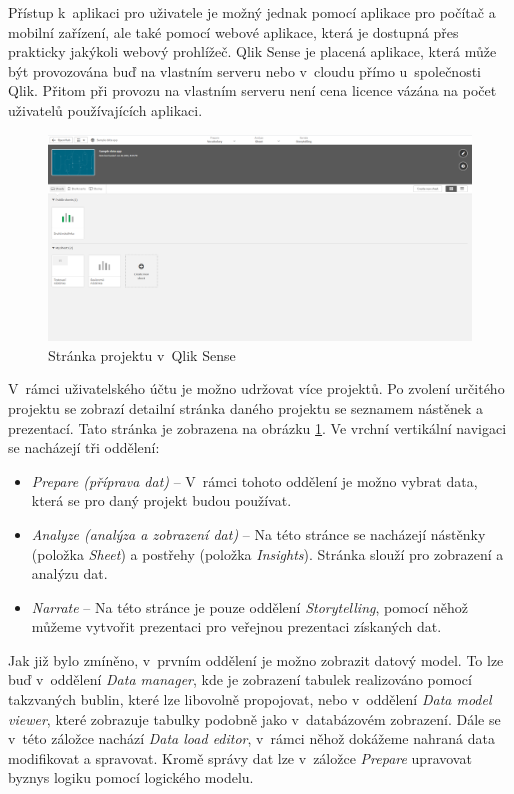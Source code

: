 \documentclass[czech,master]{diploma}
\begin{document}
Přístup k~aplikaci pro uživatele je možný jednak pomocí aplikace pro počítač a mobilní zařízení, ale také pomocí webové aplikace, která je dostupná přes prakticky jakýkoli webový prohlížeč. Qlik Sense je placená aplikace, která může být provozována buď na vlastním serveru nebo v~cloudu přímo u~společnosti Qlik. Přitom při provozu na vlastním serveru není cena licence vázána na počet uživatelů používajících aplikaci.

\begin{figure}[!ht]
    \centering
    \includegraphics[width=1\textwidth]{Diplomka/Figures/qlik_project.png}
    \caption{Stránka projektu v~Qlik Sense}
    \label{fig:qlik_project}
\end{figure}


V~rámci uživatelského účtu je možno udržovat více projektů. Po zvolení určitého projektu se zobrazí detailní stránka daného projektu se seznamem nástěnek a prezentací. Tato stránka je zobrazena na obrázku \ref{fig:qlik_project}.  Ve vrchní vertikální navigaci se nacházejí tři oddělení:

\begin{itemize}
\item \textit{Prepare (příprava dat)} -- V~rámci tohoto oddělení je možno vybrat data, která se pro daný projekt budou používat.
\item \textit{Analyze (analýza a zobrazení dat)} -- Na této stránce se nacházejí nástěnky (položka \textit{Sheet}) a postřehy (položka \textit{Insights}). Stránka slouží pro zobrazení a analýzu dat.
\item \textit{Narrate} -- Na této stránce je pouze oddělení \textit{Storytelling}, pomocí něhož můžeme vytvořit prezentaci pro veřejnou prezentaci získaných dat.
\end{itemize}


Jak již bylo zmíněno, v~prvním oddělení je možno zobrazit datový model. To lze buď v~oddělení \textit{Data manager}, kde je zobrazení tabulek realizováno pomocí takzvaných bublin, které lze libovolně propojovat, nebo v~oddělení \textit{Data model viewer}, které zobrazuje tabulky podobně jako v~databázovém zobrazení. Dále se v~této záložce nachází \textit{Data load editor}, v~rámci něhož dokážeme nahraná data modifikovat a spravovat. Kromě správy dat lze v~záložce \textit{Prepare} upravovat byznys logiku pomocí logického modelu.
\end{document}
